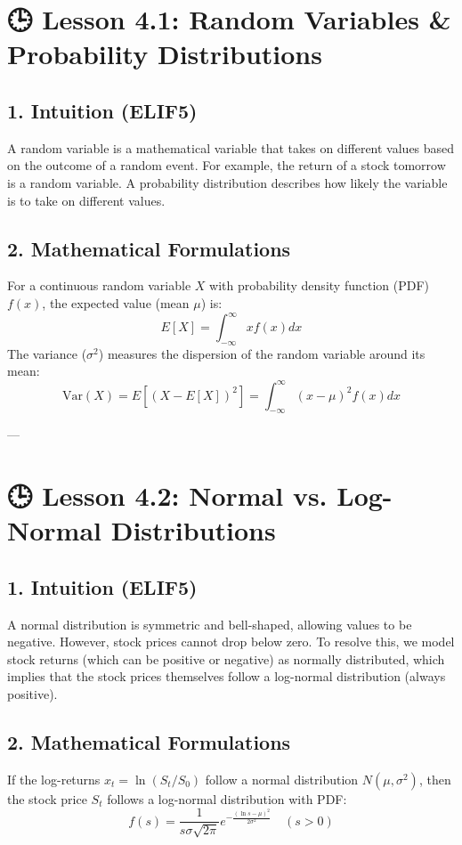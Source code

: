 \documentclass[11pt,oneside]{book}
\begin{document}
\section{🕒 Lesson 4.1: Random Variables \& Probability Distributions}

\subsection{1. Intuition (ELIF5)}
A random variable is a mathematical variable that takes on different values based on the outcome of a random event. For example, the return of a stock tomorrow is a random variable. A probability distribution describes how likely the variable is to take on different values.

\subsection{2. Mathematical Formulations}
For a continuous random variable $X$ with probability density function (PDF) $f(x)$, the expected value (mean $\mu$) is:
$$E[X] = \int_{-\infty}^{\infty} x f(x) dx$$
The variance ($\sigma^2$) measures the dispersion of the random variable around its mean:
$$\text{Var}(X) = E[(X - E[X])^2] = \int_{-\infty}^{\infty} (x - \mu)^2 f(x) dx$$

---

\section{🕒 Lesson 4.2: Normal vs. Log-Normal Distributions}

\subsection{1. Intuition (ELIF5)}
A normal distribution is symmetric and bell-shaped, allowing values to be negative. However, stock prices cannot drop below zero. To resolve this, we model stock returns (which can be positive or negative) as normally distributed, which implies that the stock prices themselves follow a log-normal distribution (always positive).

\subsection{2. Mathematical Formulations}
If the log-returns $x_t = \ln(S_t/S_0)$ follow a normal distribution $N(\mu, \sigma^2)$, then the stock price $S_t$ follows a log-normal distribution with PDF:
$$f(s) = \frac{1}{s \sigma \sqrt{2\pi}} e^{-\frac{(\ln s - \mu)^2}{2\sigma^2}} \quad (s > 0)$$
\end{document}
